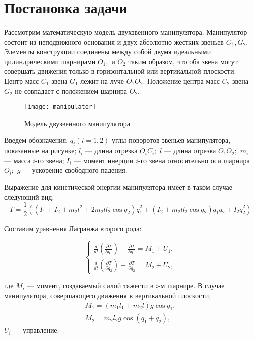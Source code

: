 \section{Постановка задачи} \label{p21}
\paragraph{}
Рассмотрим математическую модель двухзвенного манипулятора. Манипулятор состоит из неподвижного основания и двух абсолютно жестких звеньев $G_1, G_2$. Элементы конструкции соединены между собой двумя идеальными цилиндрическими шарнирами $O_1,$ и $O_2$ таким образом, что оба звена могут совершать движения только в горизонтальной или вертикальной плоскости. Центр масс $C_1$ звена $G_1$ лежит на луче $O_1 O_2.$ Положение центра масс $C_2$ звена $G_2$ не совпадает с положением шарнира $O_2$.

 \begin{figure}[h]
 	\centering
 	\texttt{[image: manipulator]}
 	\caption{Модель двузвенного манипулятора}
 	\label{fig:manip1}
 \end{figure}

Введем обозначения: $q_i (i=1, 2)$ \textemdash углы поворотов звеньев манипулятора, показанные на рисунке; $l_i$ --- длина отрезка $O_i C_i;$ $l$ --- длина отрезка $O_1 O_2;$ $m_i$  ---  масса   $i$-го звена;   $I_i$ --- момент инерции  $i$-го звена относительно оси шарнира $O_i;$ $g$ --- ускорение свободного падения.

Выражение для кинетической энергии манипулятора имеет в таком случае следующий вид:
\begin{equation}
T = \frac12 ((I_1 + I_2 + m_2 l^2 + 2 m_2 l l_2 \cos q_2) \dot q_1^2 + (I_2 + m_2 l l_2 \cos q_2) \dot q_1 \dot q_2 + I_2 \dot q_2^2)
\end{equation}

Составим уравнения Лагранжа второго рода:

\begin{equation}
\begin{cases}
\displaystyle \frac{d}{dt} \left( \frac{\partial T}{\partial \dot q_1} \right) - \frac{\partial T}{\partial q_1} = M_1 + U_1, \\
\displaystyle \frac{d}{dt} \left( \frac{\partial T}{\partial \dot q_2} \right) - \frac{\partial T}{\partial q_2} = M_2 + U_2,
\end{cases}
\end{equation}

где $M_i$ --- момент, создаваемый силой тяжести в $i$-м шарнире. В случае манипулятора, совершающего движения в вертикальной плоскости, 
$$
\begin{array}{l}
M_1 = (m_1 l_1 + m_2 l) g \cos q_1, \\
M_2 = m_2 l_2 g \cos (q_1 + q_2),
\end{array}
$$
$U_i$ --- управление.

